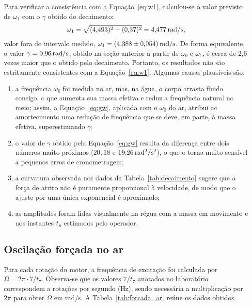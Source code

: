 Para verificar a consistência com a Equação~\eqref{eq:w1}, calculou-se o valor previsto de $\omega_1$ com o $\gamma$ obtido do decaimento:
\[
\omega_1=\sqrt{(4{,}493)^2-(0{,}37)^2}=4{,}477\,\mathrm{rad/s},
\]
valor fora do intervalo medido, $\omega_1=(4{,}388\pm0{,}054)\,\mathrm{rad/s}$. De forma equivalente, o valor $\gamma=0{,}96\,\mathrm{rad/s}$, obtido na seção anterior a partir de $\omega_0$ e $\omega_1$, é cerca de 2,6 vezes maior que o obtido pelo decaimento. Portanto, os resultados não são estritamente consistentes com a Equação~\eqref{eq:w1}. Algumas causas plausíveis são:
\begin{enumerate}
    \item a frequência $\omega_0$ foi medida no ar, mas, na água, o corpo arrasta fluido consigo, o que aumenta sua massa efetiva e reduz a frequência natural no meio; assim, a Equação~\eqref{eq:gw}, aplicada com o $\omega_0$ do ar, atribui ao amortecimento uma redução de frequência que se deve, em parte, à massa efetiva, superestimando $\gamma$;
    \item o valor de $\gamma$ obtido pela Equação~\eqref{eq:gw} resulta da diferença entre dois números muito próximos ($20{,}18$ e $19{,}26\,\mathrm{rad^2/s^2}$), o que o torna muito sensível a pequenos erros de cronometragem;
    \item a curvatura observada nos dados da Tabela~\ref{tab:decaimento} sugere que a força de atrito não é puramente proporcional à velocidade, de modo que o ajuste por uma única exponencial é aproximado;
    \item as amplitudes foram lidas visualmente na régua com a massa em movimento e nos instantes $t_n$ estimados pelo operador.
\end{enumerate}

\subsection{Oscilação forçada no ar}

Para cada rotação do motor, a frequência de excitação foi calculada por $\Omega=2\pi\cdot7/t_7$. Observa-se que os valores $7/t_7$ anotados no laboratório correspondem a rotações por segundo (Hz), sendo necessária a multiplicação por $2\pi$ para obter $\Omega$ em rad/s. A Tabela~\ref{tab:forcada_ar} reúne os dados obtidos.

